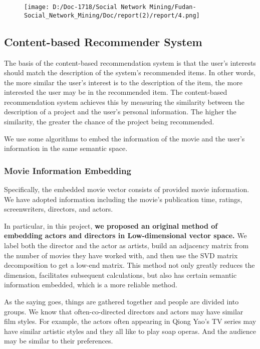 \documentclass[]{article}
\begin{document}
\begin{figure}
\centering
\texttt{[image: D:/Doc-1718/Social Network Mining/Fudan-Social\_Network\_Mining/Doc/report(2)/report/4.png]}
\caption{}
\end{figure}

\hypertarget{header-n72}{%
\subsection{Content-based Recommender System}\label{header-n72}}

The basis of the content-based recommendation system is that the user's
interests should match the description of the system's recommended
items. In other words, the more similar the user's interest is to the
description of the item, the more interested the user may be in the
recommended item. The content-based recommendation system achieves this
by measuring the similarity between the description of a project and the
user's personal information. The higher the similarity, the greater the
chance of the project being recommended.

We use some algorithms to embed the information of the movie and the
user's information in the same semantic space.

\hypertarget{header-n77}{%
\subsubsection{Movie Information Embedding}\label{header-n77}}

Specifically, the embedded movie vector consists of provided movie
information. We have adopted information including the movie's
publication time, ratings, screenwriters, directors, and actors.

In particular, in this project, \textbf{we proposed an original method
of embedding actors and directors in Low-dimensional vector space.} We
label both the director and the actor as artists, build an adjacency
matrix from the number of movies they have worked with, and then use the
SVD matrix decomposition to get a low-end matrix. This method not only
greatly reduces the dimension, facilitates subsequent calculations, but
also has certain semantic information embedded, which is a more reliable
method.

As the saying goes, things are gathered together and people are divided
into groups. We know that often-co-directed directors and actors may
have similar film styles. For example, the actors often appearing in
Qiong Yao's TV series may have similar artistic styles and they all like
to play soap operas. And the audience may be similar to their
preferences.
\end{document}
